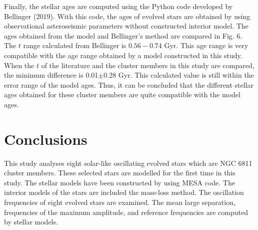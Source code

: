 \documentclass[a4paper,fleqn,usenatbib]{mnras}     %
\begin{document}
{Finally, the stellar ages are computed using the 
Python code developed by Bellinger (2019).
With this code, the ages of evolved stars 
are obtained by using observational 
asteroseismic parameters without constructed interior model.
The ages obtained from the model and Bellinger's method are compared in Fig. 6.
The $t$ range calculated from Bellinger is $0.56-0.74$ Gyr.
This age range is 
very compatible with the age range 
obtained by a model constructed in this study.
When the $t$ of the literature and the cluster members in this study are compared, 
the minimum difference is 0.01$\pm$0.28 Gyr.
This calculated value is still within the error range of the model ages.
Thus, it can be concluded that the different stellar ages obtained for 
these cluster members are quite compatible with the model ages.


\section{Conclusions}
This study analyses 
eight solar-like oscillating 
evolved stars which are NGC 6811 cluster members.
These selected stars are modelled for the first time in this study.
The stellar models have been constructed 
by using {\small {MESA}} code.
The interior models of the 
 stars are included the  mass-loss method.
The oscillation frequencies of eight evolved stars are examined. 
The mean large separation, frequencies of 
the maximum amplitude, and
reference frequencies are computed by stellar models.

}
\end{document}
